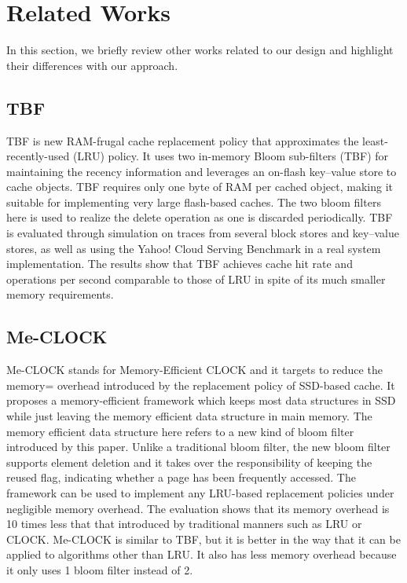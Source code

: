 \documentclass[conference]{IEEEtran}
\begin{document}
\section{Related Works}
In this section, we briefly review other works related to our design and highlight their differences with our approach.

\subsection{TBF}
TBF \cite{b2} is new RAM-frugal cache replacement policy that approximates the least-recently-used (LRU) policy. It uses two in-memory Bloom sub-filters (TBF) for maintaining the recency information and leverages an on-flash key–value store to cache objects. TBF requires only one byte of RAM per cached object, making it suitable for implementing very large flash-based caches. The two bloom filters here is used to realize the delete operation as one is discarded periodically. TBF is evaluated through simulation on traces from several block stores and key–value stores, as well as using the Yahoo! Cloud Serving Benchmark in a real system implementation. The results show that TBF achieves cache hit rate and operations per second comparable to those of LRU in spite of its much smaller memory requirements.

\subsection{Me-CLOCK}
Me-CLOCK \cite{b3} stands for Memory-Efficient CLOCK and it targets to reduce the memory= overhead introduced by the replacement policy of SSD-based cache. It proposes a memory-efficient framework which keeps most data structures in SSD while just leaving the memory efficient data structure in main memory.
The memory efficient data structure here refers to a new kind of bloom filter introduced by this paper. Unlike a traditional bloom filter, the new bloom filter supports element deletion and it takes over the responsibility of keeping the reused flag, indicating whether a page has been frequently accessed. The framework can be used to implement any LRU-based replacement policies under negligible memory overhead. The evaluation shows that its memory overhead is 10 times less that that introduced by traditional manners such as LRU or CLOCK.
Me-CLOCK is similar to TBF, but it is better in the way that it can be applied to algorithms other than LRU. It also has less memory overhead because it only uses 1 bloom filter instead of 2.
\end{document}
